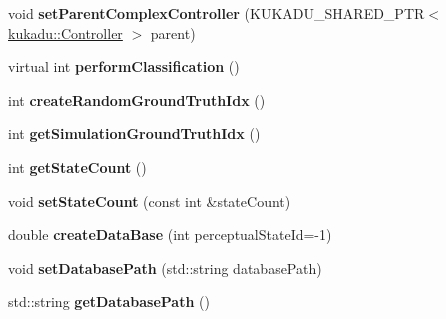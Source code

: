 \begin{DoxyCompactItemize}
\item 
void {\bfseries set\+Parent\+Complex\+Controller} (K\+U\+K\+A\+D\+U\+\_\+\+S\+H\+A\+R\+E\+D\+\_\+\+P\+TR$<$ \hyperlink{classkukadu_1_1Controller}{kukadu\+::\+Controller} $>$ parent)\hypertarget{classkukadu_1_1SensingController_ad35c01b00c990a21835c6a3f091c69a8}{}\label{classkukadu_1_1SensingController_ad35c01b00c990a21835c6a3f091c69a8}

\item 
virtual int {\bfseries perform\+Classification} ()\hypertarget{classkukadu_1_1SensingController_a468b1f5eaa22b3e39fdc7a037814f826}{}\label{classkukadu_1_1SensingController_a468b1f5eaa22b3e39fdc7a037814f826}

\item 
int {\bfseries create\+Random\+Ground\+Truth\+Idx} ()\hypertarget{classkukadu_1_1SensingController_a815c20754da20f64b88d64e5871a1c3d}{}\label{classkukadu_1_1SensingController_a815c20754da20f64b88d64e5871a1c3d}

\item 
int {\bfseries get\+Simulation\+Ground\+Truth\+Idx} ()\hypertarget{classkukadu_1_1SensingController_ace961740476ac430a6ba0dd023f5e4d2}{}\label{classkukadu_1_1SensingController_ace961740476ac430a6ba0dd023f5e4d2}

\item 
int {\bfseries get\+State\+Count} ()\hypertarget{classkukadu_1_1SensingController_afa3b29d5bd12159319d1f0e268aa8087}{}\label{classkukadu_1_1SensingController_afa3b29d5bd12159319d1f0e268aa8087}

\item 
void {\bfseries set\+State\+Count} (const int \&state\+Count)\hypertarget{classkukadu_1_1SensingController_aad3d56f68ad45580451bba7a55bb3046}{}\label{classkukadu_1_1SensingController_aad3d56f68ad45580451bba7a55bb3046}

\item 
double {\bfseries create\+Data\+Base} (int perceptual\+State\+Id=-\/1)\hypertarget{classkukadu_1_1SensingController_ac77a1ea9ec80cbdfb3ed327f81974f0a}{}\label{classkukadu_1_1SensingController_ac77a1ea9ec80cbdfb3ed327f81974f0a}

\item 
void {\bfseries set\+Database\+Path} (std\+::string database\+Path)\hypertarget{classkukadu_1_1SensingController_a933ad063e837843893cf67a983c22365}{}\label{classkukadu_1_1SensingController_a933ad063e837843893cf67a983c22365}

\item 
std\+::string {\bfseries get\+Database\+Path} ()\hypertarget{classkukadu_1_1SensingController_abe59136d736a9fafdd6b8281982a4e0c}{}\label{classkukadu_1_1SensingController_abe59136d736a9fafdd6b8281982a4e0c}


\end{DoxyCompactItemize}
